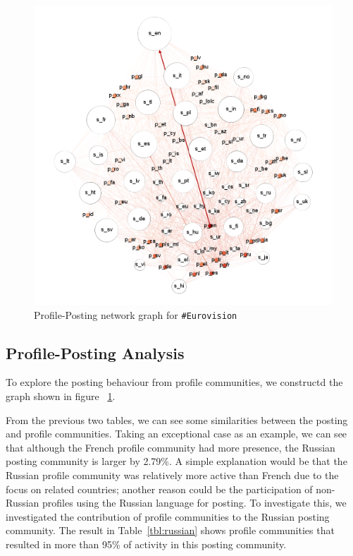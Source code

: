 \begin{figure}[htb]
\centering
\includegraphics[width=\columnwidth]{images/euro_pslang.png}
\caption{Profile-Posting network graph for {\texttt{\#Eurovision}}}
\label{fig:eurovisionpslang}
\end{figure}

\subsection{Profile-Posting Analysis}\label{eurovisionppanalysis}
To explore the posting behaviour from profile communities, we constructd the graph shown
in figure ~\ref{fig:eurovisionpslang}.

From the previous two tables, we can see some similarities between the
posting and profile communities. Taking an exceptional case as an
example, we can see that although the French profile community had
more presence, the Russian posting community is larger by 2.79\%. A
simple explanation would be that the Russian profile community was
relatively more active than French due to the focus on related
countries; another reason could be the participation of non-Russian
profiles using the Russian language for posting. To investigate this,
we investigated the contribution of profile communities to the Russian
posting community. The result in Table~\ref{tbl:russian} shows profile
communities that resulted in more than 95\% of activity in this
posting community.

